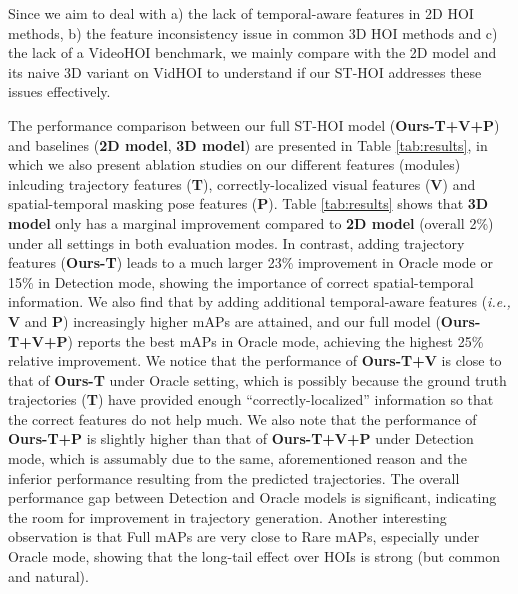\documentclass[sigconf]{acmart}
\begin{document}
Since we aim to deal with a) the lack of temporal-aware features in 2D HOI methods, b) the feature inconsistency issue in common 3D HOI methods and c) the lack of a VideoHOI benchmark, we mainly compare with the 2D model \cite{wan2019pose} and its naive 3D variant on VidHOI to understand if our ST-HOI addresses these issues effectively.

The performance comparison between our full ST-HOI model (\textbf{Ours-T+V+P}) and baselines (\textbf{2D model}, \textbf{3D model}) are presented in Table \ref{tab:results}, in which we also present ablation studies on our different features (modules) inlcuding trajectory features (\textbf{T}), correctly-localized visual features (\textbf{V}) and spatial-temporal masking pose features (\textbf{P}).
Table \ref{tab:results} shows that \textbf{3D model} only has a marginal improvement compared to \textbf{2D model} (overall 2\%) under all settings in both evaluation modes.
In contrast, adding trajectory features (\textbf{Ours-T}) leads to a much larger 23\% improvement in {\selectfont Oracle} mode or 15\% in {\selectfont Detection} mode, showing the importance of correct spatial-temporal information.
We also find that by adding additional temporal-aware features (\emph{i.e.,} \textbf{V} and \textbf{P}) increasingly higher mAPs are attained, and our full model (\textbf{Ours-T+V+P}) reports the best mAPs in {\selectfont Oracle} mode, achieving the highest 25\% relative improvement.
We notice that the performance of \textbf{Ours-T+V} is close to that of \textbf{Ours-T} under {\selectfont Oracle} setting, which is possibly because the ground truth trajectories (\textbf{T}) have provided enough ``correctly-localized'' information so that the correct features do not help much.
We also note that the performance of \textbf{Ours-T+P} is slightly higher than that of \textbf{Ours-T+V+P} under {\selectfont Detection} mode, which is assumably due to the same, aforementioned reason and the inferior performance resulting from the predicted trajectories.
The overall performance gap between {\selectfont Detection} and {\selectfont Oracle} models is significant, indicating the room for improvement in trajectory generation.
Another interesting observation is that Full mAPs are very close to Rare mAPs, especially under {\selectfont Oracle} mode, showing that the long-tail effect over HOIs is strong (but common and natural).
\end{document}
